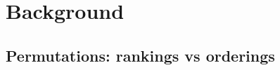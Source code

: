 \documentclass[sigconf,dvipsnames]{acmart}
\begin{document}
%
%
%
%
%
%

\section{Background}\label{sec:backgroud}

\subsection{Permutations: rankings vs orderings}
\end{document}
